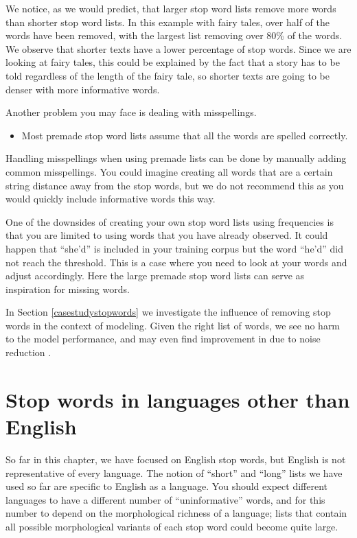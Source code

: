 \documentclass[
]{krantz}
\newenvironment{rmdblock}[1]
  {\begin{shaded*}
  \begin{itemize}[left = -1cm, labelsep = 1cm]
  \renewcommand{\labelitemi}{
    \raisebox{-.7\height}[0pt][0pt]{
      {\setkeys{Gin}{width=3em,keepaspectratio}\texttt{[image: images/\#1]}}
    }
  }
 
  \item
  }
  {
  \end{itemize}
  \end{shaded*}
  }
\newenvironment{rmdwarning}
  {\begin{rmdblock}{warning}}
  {\end{rmdblock}}
\begin{document}
We notice, as we would predict, that larger stop word lists remove more words than shorter stop word lists. In this example with fairy tales, over half of the words have been removed, with the largest list removing over 80\% of the words. We observe that shorter texts have a lower percentage of stop words. Since we are looking at fairy tales, this could be explained by the fact that a story has to be told regardless of the length of the fairy tale, so shorter texts are going to be denser with more informative words.

Another problem you may face is dealing with misspellings.

\begin{rmdwarning}
Most premade stop word lists assume that all the words are spelled
correctly.
\end{rmdwarning}

Handling misspellings when using premade lists can be done by manually adding common misspellings. You could imagine creating all words that are a certain string distance away from the stop words, but we do not recommend this as you would quickly include informative words this way.

One of the downsides of creating your own stop word lists using frequencies is that you are limited to using words that you have already observed. It could happen that ``she'd'' is included in your training corpus but the word ``he'd'' did not reach the threshold. This is a case where you need to look at your words and adjust accordingly. Here the large premade stop word lists can serve as inspiration for missing words.

In Section \ref{casestudystopwords} we investigate the influence of removing stop words in the context of modeling. Given the right list of words, we see no harm to the model performance, and may even find improvement in due to noise reduction \citep{Feldman2007}.

\hypertarget{stop-words-in-languages-other-than-english}{%
\section{Stop words in languages other than English}\label{stop-words-in-languages-other-than-english}}

So far in this chapter, we have focused on English stop words, but English is not representative of every language. The notion of ``short'' and ``long'' lists we have used so far are specific to English as a language. You should expect different languages to have a different number of ``uninformative'' words, and for this number to depend on the morphological richness of a language; lists that contain all possible morphological variants of each stop word could become quite large.
\end{document}

